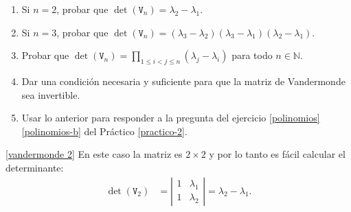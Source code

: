 \begin{enumerate}[topsep=6pt,itemsep=.4cm]
    
    \begin{enumerate}
        \item\label{vandermonde 2} Si $n=2$, probar que $\det(\mathtt V_n) = \lambda_2-\lambda_1$.
        \item\label{vandermonde 3} Si $n=3$, probar que $\det(\mathtt V_n) = (\lambda_3-\lambda_2) (\lambda_3-\lambda_1) (\lambda_2-\lambda_1)$.
        \item\label{vandermonde gral} Probar que $\det(\mathtt V_n) = \prod_{1\leq i< j \leq n}(\lambda_j-\lambda_i)$ para todo $n\in\mathbb{N}$.
        \item\label{vandermonde inv} Dar una condición necesaria y suficiente para que la matriz de Vandermonde sea invertible.
        \item\label{vandermonde sol} Usar lo anterior para responder a la pregunta del ejercicio \ref{polinomios}\,\ref{polinomios-b} del Práctico \ref{practico-2}.
        \end{enumerate}
    \rta

    \ref{vandermonde 2} En  este caso la matriz es  $2 \times 2$ y por lo tanto es fácil calcular el determinante:      
    \begin{align*}
        \det(\mathtt V_2) &= \left|\begin{matrix} 1 & \lambda_1 \\ 1 & \lambda_2 \end{matrix}\right| = \lambda_2 - \lambda_1.
    \end{align*}


\end{enumerate}
